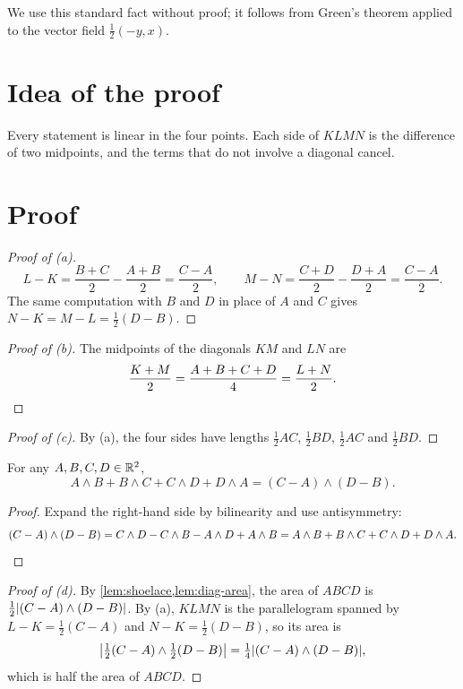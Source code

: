 \documentclass[11pt,a4paper]{article}
\begin{document}
We use this standard fact without proof; it follows from Green's theorem applied to
the vector field $\frac12(-y, x)$.

\section{Idea of the proof}

Every statement is linear in the four points. Each side of $KLMN$ is the
difference of two midpoints, and the terms that do not involve a diagonal cancel.

\section{Proof}

\begin{proof}[Proof of (a)]
  \[
    L - K = \frac{B + C}{2} - \frac{A + B}{2} = \frac{C - A}{2}, \qquad
    M - N = \frac{C + D}{2} - \frac{D + A}{2} = \frac{C - A}{2}.
  \]
  The same computation with $B$ and $D$ in place of $A$ and $C$ gives
  $N - K = M - L = \frac12 (D - B)$.
\end{proof}

\begin{proof}[Proof of (b)]
  The midpoints of the diagonals $KM$ and $LN$ are
  \[
    \frac{K + M}{2} = \frac{A + B + C + D}{4} = \frac{L + N}{2}. \qedhere
  \]
\end{proof}

\begin{proof}[Proof of (c)]
  By (a), the four sides have lengths $\frac12 AC$, $\frac12 BD$, $\frac12 AC$ and
  $\frac12 BD$.
\end{proof}

\begin{lemma}\label{lem:diag-area}
  For any $A, B, C, D \in \R^2$,
  \[
    A \wedge B + B \wedge C + C \wedge D + D \wedge A = (C - A) \wedge (D - B).
  \]
\end{lemma}

\begin{proof}
  Expand the right-hand side by bilinearity and use antisymmetry:
  \[
    (C - A) \wedge (D - B)
    = C \wedge D - C \wedge B - A \wedge D + A \wedge B
    = A \wedge B + B \wedge C + C \wedge D + D \wedge A. \qedhere
  \]
\end{proof}

\begin{proof}[Proof of (d)]
  By \cref{lem:shoelace,lem:diag-area}, the area of $ABCD$ is
  $\frac12 \abs{(C - A) \wedge (D - B)}$. By (a), $KLMN$ is the parallelogram
  spanned by $L - K = \frac12 (C - A)$ and $N - K = \frac12 (D - B)$, so its area is
  \[
    \abs*{\tfrac12 (C - A) \wedge \tfrac12 (D - B)}
    = \tfrac14 \abs{(C - A) \wedge (D - B)},
  \]
  which is half the area of $ABCD$.
\end{proof}
\end{document}
